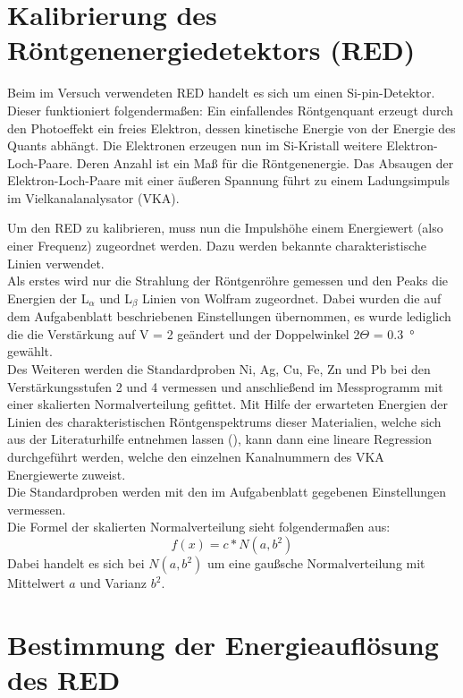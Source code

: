 \section{Kalibrierung des Röntgenenergiedetektors (RED)}

Beim im Versuch verwendeten RED handelt es sich um einen Si-pin-Detektor. Dieser funktioniert folgendermaßen: Ein einfallendes Röntgenquant erzeugt durch den Photoeffekt ein freies Elektron, dessen kinetische Energie von der Energie des Quants abhängt.
Die Elektronen erzeugen nun im Si-Kristall weitere Elektron-Loch-Paare. Deren Anzahl ist ein Maß für die Röntgenenergie. Das Absaugen der Elektron-Loch-Paare mit einer äußeren Spannung führt zu einem Ladungsimpuls im Vielkanalanalysator (VKA).

Um den RED zu kalibrieren, muss nun die Impulshöhe einem Energiewert (also einer Frequenz) zugeordnet werden. Dazu werden bekannte charakteristische Linien verwendet.\\
Als erstes wird nur die Strahlung der Röntgenröhre gemessen und den Peaks die Energien der L$_\alpha$ und L$_\beta$ Linien von Wolfram zugeordnet. Dabei wurden die auf dem Aufgabenblatt beschriebenen Einstellungen übernommen, es wurde lediglich die die Verstärkung auf V = 2 geändert und der Doppelwinkel 2$\Theta$ = \SI{0.3}{\degree} gewählt.\\
Des Weiteren werden die Standardproben Ni, Ag, Cu, Fe, Zn und Pb bei den Verstärkungsstufen 2 und 4 vermessen und anschließend im Messprogramm 
mit einer skalierten Normalverteilung gefittet. Mit Hilfe der erwarteten Energien der Linien des charakteristischen Röntgenspektrums dieser Materialien, welche sich aus der Literaturhilfe entnehmen lassen (\cite{litmap}), kann dann eine lineare Regression durchgeführt werden, welche den einzelnen Kanalnummern des VKA Energiewerte zuweist.\\
Die Standardproben werden mit den im Aufgabenblatt gegebenen Einstellungen vermessen.\\
Die Formel der skalierten Normalverteilung sieht folgenderma\ss en aus:
\begin{equation}
	f(x) = c*N(a,b^2)
	\label{gauss_scale}
\end{equation}
Dabei handelt es sich bei $N(a,b^{2})$ um eine gau\ss sche Normalverteilung mit Mittelwert $a$ und Varianz $b^{2}$.

\section{Bestimmung der Energieauflösung des RED}

